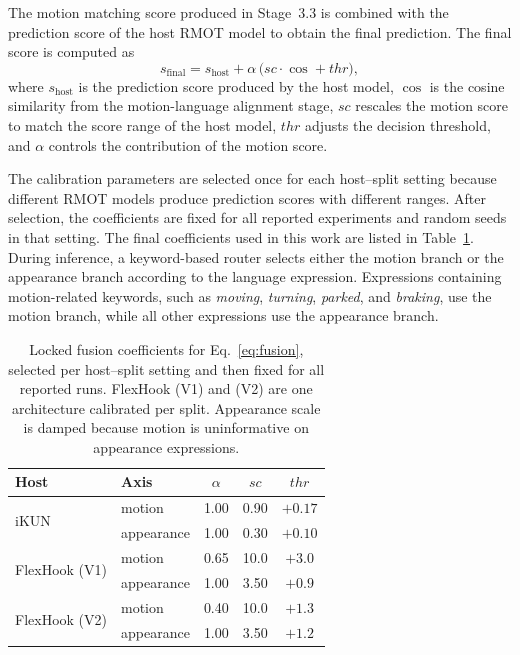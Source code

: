 \documentclass[sigconf,anonymous,nonacm]{acmart}
\begin{document}
The motion matching score produced in Stage~3.3 is combined with the prediction score of the host RMOT model to obtain the final prediction. The final score is computed as
\begin{equation}
s_{\mathrm{final}} = s_{\mathrm{host}} + \alpha\,\bigl(\mathit{sc}\cdot\cos + \mathit{thr}\bigr),
\label{eq:fusion}
\end{equation}
where $s_{\mathrm{host}}$ is the prediction score produced by the host model, $\cos$ is the cosine similarity from the motion-language alignment stage, $\mathit{sc}$ rescales the motion score to match the score range of the host model, $\mathit{thr}$ adjusts the decision threshold, and $\alpha$ controls the contribution of the motion score.

The calibration parameters are selected once for each host--split setting because different RMOT models produce prediction scores with different ranges. After selection, the coefficients are fixed for all reported experiments and random seeds in that setting. The final coefficients used in this work are listed in Table~\ref{tab:recipe}. During inference, a keyword-based router selects either the motion branch or the appearance branch according to the language expression. Expressions containing motion-related keywords, such as \emph{moving}, \emph{turning}, \emph{parked}, and \emph{braking}, use the motion branch, while all other expressions use the appearance branch.

\begin{table}[t]
\centering
\caption{Locked fusion coefficients for Eq.~\ref{eq:fusion}, selected per host--split setting and then fixed for all reported runs. FlexHook (V1) and (V2) are one architecture calibrated per split. Appearance scale is damped because motion is uninformative on appearance expressions.}
\label{tab:recipe}
\small
\begin{tabular}{llccc}
\toprule
Host & Axis & $\alpha$ & $\mathit{sc}$ & $\mathit{thr}$ \\
\midrule
\multirow{2}{*}{iKUN}        & motion     & 1.00 & 0.90 & $+0.17$ \\
                             & appearance & 1.00 & 0.30 & $+0.10$ \\
\midrule
\multirow{2}{*}{FlexHook (V1)} & motion     & 0.65 & 10.0 & $+3.0$  \\
                             & appearance & 1.00 & 3.50 & $+0.9$  \\
\midrule
\multirow{2}{*}{FlexHook (V2)} & motion     & 0.40 & 10.0 & $+1.3$  \\
                             & appearance & 1.00 & 3.50 & $+1.2$  \\
\bottomrule
\end{tabular}
\end{table}
\end{document}
